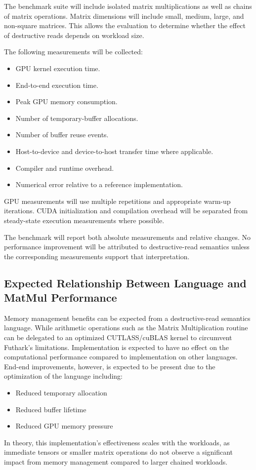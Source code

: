 \documentclass[a4paper]{article}
\begin{document}
	The benchmark suite will include isolated matrix multiplications as well as chains of matrix operations. Matrix dimensions will include small, medium, large, and non-square matrices. This allows the evaluation to determine whether the effect of destructive reads depends on workload size.
	
	The following measurements will be collected:
	
	\begin{itemize}
		\item GPU kernel execution time.
		\item End-to-end execution time.
		\item Peak GPU memory consumption.
		\item Number of temporary-buffer allocations.
		\item Number of buffer reuse events.
		\item Host-to-device and device-to-host transfer time where applicable.
		\item Compiler and runtime overhead.
		\item Numerical error relative to a reference implementation.
	\end{itemize}
	
	GPU measurements will use multiple repetitions and appropriate warm-up iterations. CUDA initialization and compilation overhead will be separated from steady-state execution measurements where possible.
	
	The benchmark will report both absolute measurements and relative changes. No performance improvement will be attributed to destructive-read semantics unless the corresponding measurements support that interpretation.
	


	\subsection{Expected Relationship Between Language and MatMul Performance}
	
	Memory management benefits can be expected from a destructive-read semantics language. While arithmetic operations such as the Matrix Multiplication routine can be delegated to an optimized CUTLASS/cuBLAS kernel to circumvent \cite{futhark} Futhark's limitations. Implementation is expected to have no effect on the computational performance compared to implementation on other languages. End-end improvements, however, is expected to be present due to the optimization of the language including:
	\begin{itemize} 
		\item Reduced temporary allocation
		\item Reduced buffer lifetime
		\item Reduced GPU memory pressure
	\end{itemize}
	In theory, this implementation's effectiveness scales with the workloads, as immediate tensors or smaller matrix operations do not observe a significant impact from memory management compared to larger chained workloads.
	
\end{document}
